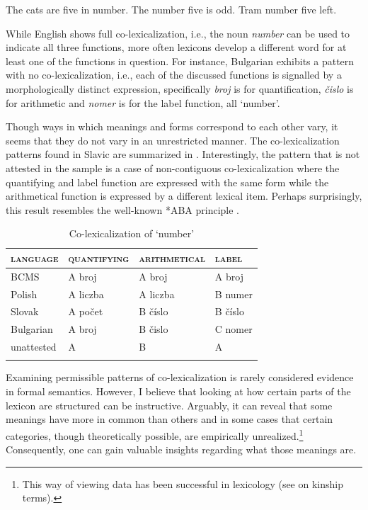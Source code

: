 \documentclass[output=paper]{langscibook}
\begin{document}
		\ea\label{ex:polysemy-english} \ea The cats are five in number.\label{ex:polysemy-english-q}
		\ex The number five is odd.\label{ex:polysemy-english-a}
	\ex Tram number five left.\label{ex:polysemy-english-l}
	\z
	\z

\noindent While English shows full co-lexicalization, i.e., the noun \textit{number} can be used to indicate all three functions, more often lexicons develop a different word for at least one of the functions in question. For instance, Bulgarian exhibits a pattern with no co-lexicalization, i.e., each of the discussed functions is signalled by a morphologically distinct expression, specifically \textit{broj} is for quantification, \textit{čislo} is for arithmetic and \textit{nomer} is for the label function, all `number'. 

Though ways in which meanings and forms correspond to each other vary, it seems that they do not vary in an unrestricted manner. The co-lexicalization patterns found in Slavic are summarized in . Interestingly, the pattern that is not attested in the sample is a case of non-contiguous co-lexicalization where the quantifying and label function are expressed with the same form while the arithmetical function is expressed by a different lexical item. Perhaps surprisingly, this result resembles the well-known *ABA principle \citep{bobaljik2012universals}.

	\begin{table}
		\caption{Co-lexicalization of `number'}
		\label{tab:co-lexicalization-of-number}
		\begin{tabular}{llll} 
			\lsptoprule
			\textsc{language} & \textsc{quantifying} & \textsc{arithmetical} & \textsc{label} \\ 
			\midrule
			BCMS       & A broj   & A broj   & A broj\\
			Polish     & A liczba & A liczba & B numer\\
			Slovak     & A počet  & B číslo  & B číslo\\
			Bulgarian  & A broj   & B čislo  & C nomer\\
			unattested & A        & B        & A\\
			\lspbottomrule
		\end{tabular}
	\end{table}

Examining permissible patterns of co-lexicalization is rarely considered evidence in formal semantics. However, I believe that looking at how certain parts of the lexicon are structured can be instructive. Arguably, it can reveal that some meanings have more in common than others and in some cases that certain categories, though theoretically possible, are empirically unrealized.\footnote{This way of viewing data has been successful in lexicology (see \citealt{hage1997unthinkable} on kinship terms).} Consequently, one can gain valuable insights regarding what those meanings are.
\end{document}
